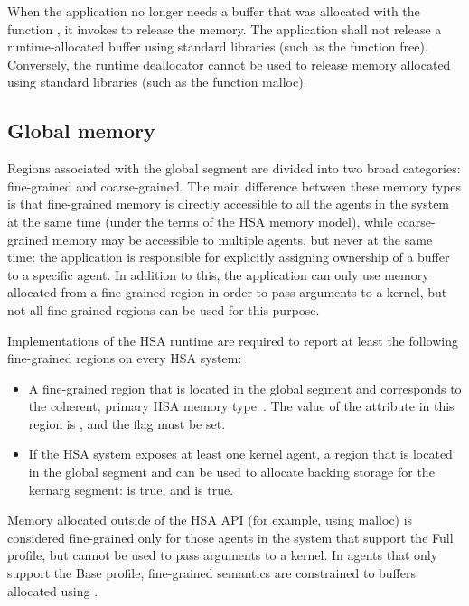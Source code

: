 \documentclass[oneside]{book}
\begin{document}
When the application no longer needs a buffer that was allocated with the
function , it invokes  to
release the memory. The application shall not release a runtime-allocated buffer
using standard libraries (such as the function free). Conversely, the runtime
deallocator cannot be used to release memory allocated using standard libraries
(such as the function malloc).

\subsection{Global memory}\label{sec:memory:global}

Regions associated with the global segment are divided into two broad
categories: fine-grained and coarse-grained. The main difference between these
memory types is that fine-grained memory is directly accessible to all the
agents in the system at the same time (under the terms of the HSA memory model),
while coarse-grained memory may be accessible to multiple agents, but never at
the same time: the application is responsible for explicitly assigning ownership
of a buffer to a specific agent. In addition to this, the application can only
use memory allocated from a fine-grained region in order to pass arguments to a
kernel, but not all fine-grained regions can be used for this purpose.

Implementations of the HSA runtime are required to report at least the following
fine-grained regions on every HSA system:
\begin{itemize}[itemsep=1pt,topsep=3pt,partopsep=0pt]
\item A fine-grained region that is located in the global segment and
  corresponds to the coherent, primary HSA memory type~\cite{sar}. The value of
  the attribute  in this region is
  , and the
   flag must be set.
\item If the HSA system exposes at least one kernel agent, a
  region that is located in the global segment and can be used to allocate
  backing storage for the kernarg segment:
   is true, and
   is true.
\end{itemize}

Memory allocated outside of the HSA API (for example, using malloc) is
considered fine-grained only for those agents in the system that support the
Full profile, but cannot be used to pass arguments to a kernel. In agents
that only support the Base profile, fine-grained semantics are constrained to
buffers allocated using .
\end{document}
